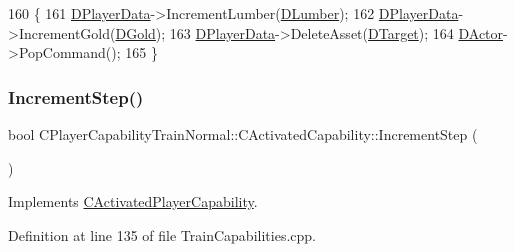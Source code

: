 \begin{DoxyCode}
160                                                              \{
161     \hyperlink{classCActivatedPlayerCapability_a9bf27c322a73f4b11c8183cc1973c3d8}{DPlayerData}->IncrementLumber(\hyperlink{classCPlayerCapabilityTrainNormal_1_1CActivatedCapability_a49a77c92b6146819efb1a7a8b6fb8972}{DLumber});
162     \hyperlink{classCActivatedPlayerCapability_a9bf27c322a73f4b11c8183cc1973c3d8}{DPlayerData}->IncrementGold(\hyperlink{classCPlayerCapabilityTrainNormal_1_1CActivatedCapability_a1b994a572ca0fdfd64f6f71afb6b5988}{DGold});
163     \hyperlink{classCActivatedPlayerCapability_a9bf27c322a73f4b11c8183cc1973c3d8}{DPlayerData}->DeleteAsset(\hyperlink{classCActivatedPlayerCapability_a8a1cf50b6501bcfd55af0c935828e395}{DTarget});
164     \hyperlink{classCActivatedPlayerCapability_a54ca944b47bff2718330639941d402b0}{DActor}->PopCommand();
165 \}
\end{DoxyCode}
\hypertarget{classCPlayerCapabilityTrainNormal_1_1CActivatedCapability_a201f09e738af96fba1a871e4ed00f18a}{}\label{classCPlayerCapabilityTrainNormal_1_1CActivatedCapability_a201f09e738af96fba1a871e4ed00f18a} 
\subsubsection{\texorpdfstring{Increment\+Step()}{IncrementStep()}}
{\footnotesize\ttfamily bool C\+Player\+Capability\+Train\+Normal\+::\+C\+Activated\+Capability\+::\+Increment\+Step (\begin{DoxyParamCaption}{ }\end{DoxyParamCaption})\hspace{0.3cm}{\ttfamily [virtual]}}



Implements \hyperlink{classCActivatedPlayerCapability_a943b5999a57504399293250382c0ec6a}{C\+Activated\+Player\+Capability}.



Definition at line 135 of file Train\+Capabilities.\+cpp.


